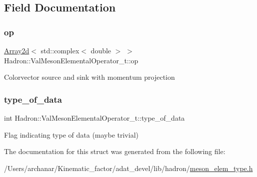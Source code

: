 \subsection{Field Documentation}
\mbox{\label{structHadron_1_1ValMesonElementalOperator__t_a4bee83a71ec09d6eea27bf327fe15742}} 
\subsubsection{\texorpdfstring{op}{op}}
{\footnotesize\ttfamily \mbox{\hyperlink{classXMLArray_1_1Array2d}{Array2d}}$<$ std\+::complex$<$ double $>$ $>$ Hadron\+::\+Val\+Meson\+Elemental\+Operator\+\_\+t\+::op}

Colorvector source and sink with momentum projection \mbox{\label{structHadron_1_1ValMesonElementalOperator__t_a6d4f446ccfc0b20cb30c9c37f424ddb6}} 
\subsubsection{\texorpdfstring{type\_of\_data}{type\_of\_data}}
{\footnotesize\ttfamily int Hadron\+::\+Val\+Meson\+Elemental\+Operator\+\_\+t\+::type\+\_\+of\+\_\+data}

Flag indicating type of data (maybe trivial) 

The documentation for this struct was generated from the following file\+:\begin{DoxyCompactItemize}
\item 
/\+Users/archanar/\+Kinematic\+\_\+factor/adat\+\_\+devel/lib/hadron/\mbox{\hyperlink{lib_2hadron_2meson__elem__type_8h}{meson\+\_\+elem\+\_\+type.\+h}}\end{DoxyCompactItemize}
